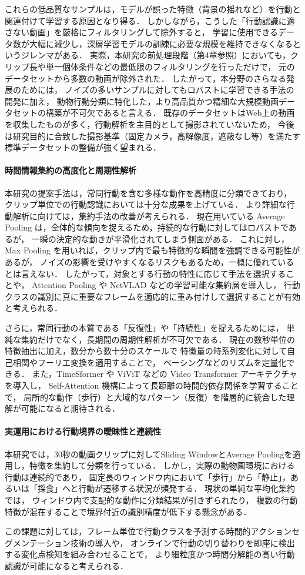 これらの低品質なサンプルは，モデルが誤った特徴（背景の揺れなど）を行動と関連付けて学習する原因となり得る．
しかしながら，こうした「行動認識に適さない動画」を厳格にフィルタリングして除外すると，
学習に使用できるデータ数が大幅に減少し，深層学習モデルの訓練に必要な規模を維持できなくなるというジレンマがある．
実際，本研究の前処理段階（第4章参照）においても，クリップ長や単一個体条件などの最低限のフィルタリングを行っただけで，
元のデータセットから多数の動画が除外された．
したがって，本分野のさらなる発展のためには，
ノイズの多いサンプルに対してもロバストに学習できる手法の開発に加え，
動物行動分類に特化した，より高品質かつ精細な大規模動画データセットの構築が不可欠であると言える．
既存のデータセットはWeb上の動画を収集したものが多く，行動解析を主目的として撮影されていないため，
今後は研究目的に合致した撮影基準（固定カメラ，高解像度，遮蔽なし等）を満たす
標準データセットの整備が強く望まれる．

\paragraph{時間情報集約の高度化と周期性解析}
本研究の提案手法は，常同行動を含む多様な動作を高精度に分類できており，
クリップ単位での行動認識においては十分な成果を上げている．
より詳細な行動解析に向けては，集約手法の改善が考えられる．
現在用いている Average Pooling は，全体的な傾向を捉えるため，持続的な行動に対してはロバストであるが，
一瞬の決定的な動きが平滑化されてしまう側面がある．
これに対し，Max Pooling を用いれば，クリップ内で最も特徴的な瞬間を強調できる可能性があるが，
ノイズの影響を受けやすくなるリスクもあるため，一概に優れているとは言えない．
したがって，対象とする行動の特性に応じて手法を選択することや，
Attention Pooling や NetVLAD などの学習可能な集約層を導入し，
行動クラスの識別に真に重要なフレームを適応的に重み付けして選択することが有効と考えられる．

さらに，常同行動の本質である「反復性」や「持続性」を捉えるためには，
単純な集約だけでなく，長期間の周期性解析が不可欠である．
現在の数秒単位の特徴抽出に加え，数分から数十分のスケールで
特徴量の時系列変化に対して自己相関やフーリエ変換を適用することで，
ペーシングなどのリズムを定量化できる．
また，TimeSformer \cite{bertasius2021space} や ViViT \cite{arnab2021vivit} などの Video Transformer アーキテクチャを導入し，
Self-Attention 機構によって長距離の時間的依存関係を学習することで，
局所的な動作（歩行）と大域的なパターン（反復）を階層的に統合した理解が可能になると期待される．

\paragraph{実運用における行動境界の曖昧性と連続性}
本研究では，30秒の動画クリップに対してSliding WindowとAverage Poolingを適用し，特徴を集約して分類を行っている．
しかし，実際の動物園環境における行動は連続的であり，
固定長のウィンドウ内において「歩行」から「静止」，あるいは「採食」へと行動が遷移する状況が頻発する．
現状の単純な平均化集約では，
ウィンドウ内で支配的な動作に分類結果が引きずられたり，
複数の行動特徴が混在することで境界付近の識別精度が低下する懸念がある．

この課題に対しては，フレーム単位で行動クラスを予測する時間的アクションセグメンテーション技術の導入や，
オンラインで行動の切り替わりを即座に検出する変化点検知を組み合わせることで，
より細粒度かつ時間分解能の高い行動認識が可能になると考えられる．